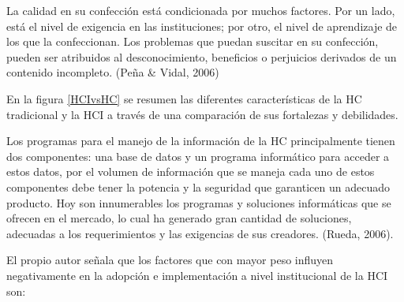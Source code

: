 La calidad en su confección está condicionada por muchos factores. Por un lado, está el nivel de exigencia en las instituciones; por otro, el nivel de aprendizaje de los que la confeccionan. Los problemas que puedan suscitar en su confección, pueden ser atribuidos al desconocimiento, beneficios o perjuicios derivados de un contenido incompleto. (Peña \& Vidal, 2006) 

En la figura \ref{HCIvsHC} se resumen las diferentes características de la HC tradicional y la HCI a través de una comparación de sus fortalezas y debilidades.

 

Los programas para el manejo de la información de la HC principalmente tienen dos componentes: una base de datos y un programa informático para acceder a estos datos, por el volumen de información que se maneja cada uno de estos componentes debe tener la potencia y la seguridad que garanticen un adecuado producto. Hoy son innumerables los programas y soluciones informáticas que se ofrecen en el mercado, lo cual ha generado gran cantidad de soluciones, adecuadas a los requerimientos y las exigencias de sus creadores. (Rueda, 2006).    
\newline

El propio autor señala que los factores que con mayor peso influyen negativamente en la adopción e implementación a nivel institucional de la HCI son:  

